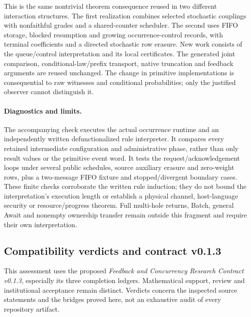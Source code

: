 \documentclass[11pt]{article}
\begin{document}
This is the same nontrivial theorem consequence reused in two different interaction structures. The first realization combines selected stochastic couplings with nonfaithful grades and a shared-counter scheduler. The second uses FIFO storage, blocked resumption and growing occurrence-control records, with terminal coefficients and a directed stochastic row erasure. New work consists of the queue/control interpretation and its local certificates. The generated joint comparison, conditional-law/prefix transport, native truncation and feedback arguments are reused unchanged. The change in primitive implementations is consequential to raw witnesses and conditional probabilities; only the justified observer cannot distinguish it.

\paragraph{Diagnostics and limits.} The accompanying check executes the actual occurrence runtime and an independently written defunctionalized rule interpreter. It compares every retained intermediate configuration and administrative phase, rather than only result values or the primitive event word. It tests the request/acknowledgement loops under several public schedules, source auxiliary erasure and zero-weight rows, plus a two-message FIFO fixture and stopped/divergent boundary cases. These finite checks corroborate the written rule induction; they do not bound the interpretation's execution length or establish a physical channel, host-language security or resource/progress theorem. Full multi-hole returns, Batch, general Await and nonempty ownership transfer remain outside this fragment and require their own interpretation.


\subsection{Compatibility verdicts and contract v0.1.3}\label{sec:core-completion-assessment}

This assessment uses the proposed \emph{Feedback and Concurrency Research Contract v0.1.3}, especially its three completion ledgers. Mathematical support, review and institutional acceptance remain distinct. Verdicts concern the inspected source statements and the bridges proved here, not an exhaustive audit of every repository artifact.
\end{document}
